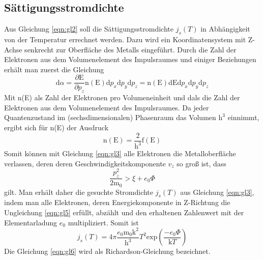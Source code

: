 \subsection{Sättigungsstromdichte}
Aus Gleichung \eqref{eqn:gl2} soll die Sättigungsstromdichte $j_s(T)$ in Abhängigkeit von der Temperatur errechnet werden.
Dazu wird ein Koordinatensystem mit Z-Achse senkrecht zur Oberfläche des Metalls eingeführt.
Durch die Zahl der Elektronen aus dem Volumenelement des Impulsraumes und einiger Beziehungen erhält man zuerst die Gleichung
\begin{equation}
    \text{d}\alpha = \frac{\partial \text{E}}{\partial p_z} \text{n}(\text{E}) \text{d}p_x \text{d}p_y \text{d}p_z = \text{n}(\text{E}) \text{d}\text{E} \text{d}p_x \text{d}p_y \text{d}p_z
    \label{eqn:gl3}
\end{equation}
Mit n(E) als Zahl der Elektronen pro Volumeneinheit und d\alpha als die Zahl der Elektronen aus dem Volumenelement des Impulsraumes.
Da jeder Quantenzustand im (sechsdimensionalen) Phasenraum das Volumen $\text{h}^3$ einnimmt, ergibt sich für n(E) der Ausdruck
\begin{equation}
    \text{n}(\text{E}) = \frac{2}{\text{h}^3}\text{f}(\text{E})
    \label{eqn:gl4}
\end{equation}
Somit können mit Gleichung \eqref{eqn:gl3} alle Elektronen die Metalloberfläche verlassen, deren deren Geschwindigkeitskomponente $v_z$ so groß ist, dass
\begin{equation}
    \frac{p_z^2}{2\text{m}_0} > \xi + e_0 \Phi
    \label{eqn:gl5}
\end{equation}
gilt.
Man erhält daher die gesuchte Stromdichte $j_s(T)$ aus Gleichung \eqref{eqn:gl3}, indem man alle Elektronen, deren Energiekomponente in Z-Richtung die Ungleichung \eqref{eqn:gl5} erfüllt, abzählt und den erhaltenen Zahlenwert mit der Elementarladung $e_0$ multipliziert.
Somit ist
\begin{equation}
    j_s(T) = 4 \pi \frac{e_0 \text{m}_0 \text{k}^2}{\text{h}^3}T^2 \text{exp}\left(\frac{-e_0 \Phi}{\text{k} T}\right)
    \label{eqn:gl6}
\end{equation}
Die Gleichung \eqref{eqn:gl6} wird als Richardson-Gleichung bezeichnet.

